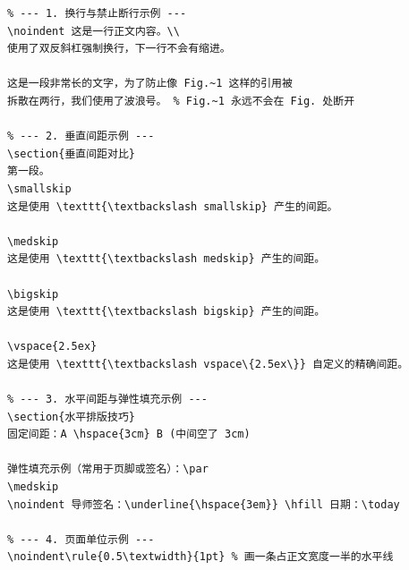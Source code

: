 \begin{lstlisting}
% --- 1. 换行与禁止断行示例 ---
\noindent 这是一行正文内容。\\ 
使用了双反斜杠强制换行，下一行不会有缩进。

这是一段非常长的文字，为了防止像 Fig.~1 这样的引用被
拆散在两行，我们使用了波浪号。 % Fig.~1 永远不会在 Fig. 处断开

% --- 2. 垂直间距示例 ---
\section{垂直间距对比}
第一段。
\smallskip 
这是使用 \texttt{\textbackslash smallskip} 产生的间距。

\medskip
这是使用 \texttt{\textbackslash medskip} 产生的间距。

\bigskip
这是使用 \texttt{\textbackslash bigskip} 产生的间距。

\vspace{2.5ex} 
这是使用 \texttt{\textbackslash vspace\{2.5ex\}} 自定义的精确间距。

% --- 3. 水平间距与弹性填充示例 ---
\section{水平排版技巧}
固定间距：A \hspace{3cm} B (中间空了 3cm)

弹性填充示例（常用于页脚或签名）：\par
\medskip
\noindent 导师签名：\underline{\hspace{3em}} \hfill 日期：\today

% --- 4. 页面单位示例 ---
\noindent\rule{0.5\textwidth}{1pt} % 画一条占正文宽度一半的水平线    
\end{lstlisting}


